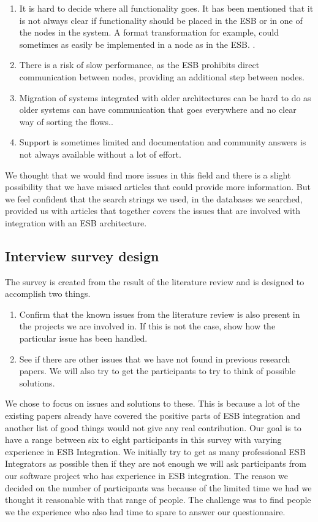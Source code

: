 \documentclass{llncs}
\begin{document}
\begin{enumerate}
\item It is hard to decide where all functionality goes. It has been mentioned that it is not always clear if functionality should be placed in the ESB or in one of the nodes in the system. A format transformation for example, could sometimes as easily be implemented in a node as in the ESB.  \cite{ortiz07}.
\item There is a risk of slow performance, as the ESB prohibits direct communication between nodes, providing an additional step between nodes.
\item Migration of systems integrated with older architectures can be hard to do as older systems can have communication that goes everywhere and no clear way of sorting the flows.\cite{ortiz07}.
\item Support is sometimes limited and documentation and community answers is not always available without a lot of effort.
\end{enumerate}

We thought that we would find more issues in this field and there is a slight possibility that we have missed articles that could provide more information. But we feel confident that the search strings we used, in the databases we searched, provided us with articles that together covers the issues that are involved with integration with an ESB architecture.

\subsection{Interview survey design}

The survey is created from the result of the literature review and is designed to accomplish two things.
\begin{enumerate}
\item Confirm that the known issues from the literature review is also present in the projects we are involved in. If this is not the case, show how the particular issue has been handled.
\item See if there are other issues that we have not found in previous research papers. We will also try to get the participants to try to think of possible solutions.
\end{enumerate}

We chose to focus on issues and solutions to these. This is because a lot of the existing papers already have covered the positive parts of ESB integration and another list of good things would not give any real contribution.
Our goal is to have a range between six to eight participants in this survey with varying experience in ESB Integration. We initially try to get as many professional ESB Integrators as possible then if they are not enough we will ask participants from our software project who has experience in ESB integration. The reason we decided on the number of participants was because of the limited time we had we thought it reasonable with that range of people. The challenge was to find people we the experience who also had time to spare to answer our questionnaire. 
\end{document}
